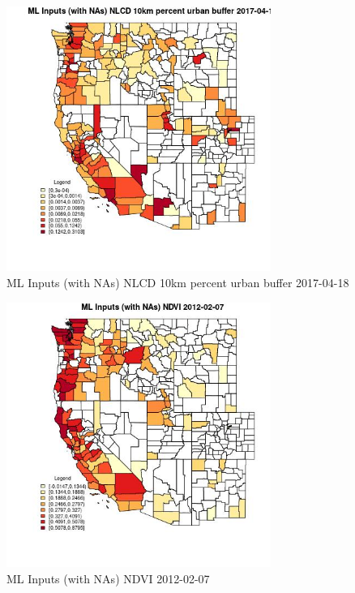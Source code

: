 \begin{figure} 
\centering  
\includegraphics[width=0.77\textwidth]{Code_Outputs/Report_ML_input_PM25_Step4_part_f_de_duplicated_aveswNAs_CountyNLCD_10km_percent_urban_bufferMean2017-04-18.jpg} 
\caption{\label{fig:Report_ML_input_PM25_Step4_part_f_de_duplicated_aveswNAsCountyNLCD_10km_percent_urban_bufferMean2017-04-18}ML Inputs (with NAs) NLCD 10km percent urban buffer 2017-04-18} 
\end{figure} 
 

\begin{figure} 
\centering  
\includegraphics[width=0.77\textwidth]{Code_Outputs/Report_ML_input_PM25_Step4_part_f_de_duplicated_aveswNAs_CountyNDVIMean2012-02-07.jpg} 
\caption{\label{fig:Report_ML_input_PM25_Step4_part_f_de_duplicated_aveswNAsCountyNDVIMean2012-02-07}ML Inputs (with NAs) NDVI 2012-02-07} 
\end{figure} 
 

